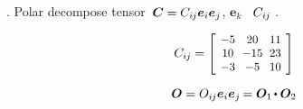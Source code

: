\begin{tcolorbox}
\small\setlength{\abovedisplayskip}{2pt}\setlength{\belowdisplayskip}{2pt}

.
Polar decompose tensor~${\bm{C} = C_{i\hspace{-0.1ex}j} \bm{e}_i \bm{e}_j}$,
${\bm{e}_k}$
~$C_{i\hspace{-0.1ex}j}$
.

\begin{equation*}
C_{i\hspace{-0.1ex}j} =
\scalebox{0.92}[0.92]{$\left[\hspace{-0.2ex}\begin{array}{c@{\hspace{.6em}}c@{\hspace{.6em}}c}
-5 & 20 & 11 \\
10 & -15 & 23 \\
-3 & -5 & 10
\end{array}\hspace{-0.2ex}\right]$}
\end{equation*}

\begin{equation*}
\rotationtensor = O_{i\hspace{-0.1ex}j} \bm{e}_i \bm{e}_j \hspace{-0.2ex}
= \bm{O}_1 \hspace{-0.2ex} \dotp \bm{O}_2
\end{equation*}


\end{tcolorbox}
